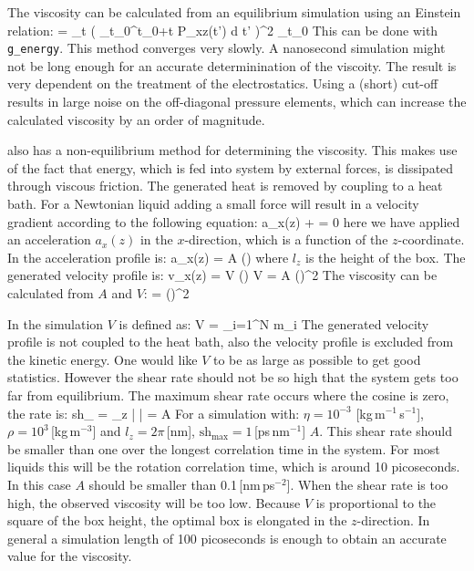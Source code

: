 The viscosity can be calculated from an equilibrium simulation using
an Einstein relation:
\beq
\eta =  \lim_{t \rightarrow \infty}
 \left\langle 
\left( \int_{t_0}^{{t_0}+t} P_{xz}(t') \mbox{d} t' \right)^2
\right\rangle_{t_0}
\eeq
This can be done with {\tt g\_energy}.
This method converges very slowly. A nanosecond simulation might not
be long enough for an accurate determinination of the viscoity.
The result is very dependent on the treatment of the electrostatics.
Using a (short) cut-off results in large noise on the off-diagonal
pressure elements, which can increase the calculated viscosity by an order
of magnitude.

{\gromacs} also has a non-equilibrium method for determining the viscosity.
This makes use of the fact that energy, which is fed into system by
external forces, is dissipated through viscous friction. The generated heat
is removed by coupling to a heat bath. For a Newtonian liquid adding a 
small force will result in a velocity gradient according to the following
equation:
\beq
a_x(z) + \frac{\eta}{\rho}  = 0
\eeq
here we have applied an acceleration $a_x(z)$ in the $x$-direction, which
is a function of the $z$-coordinate.
In {\gromacs} the acceleration profile is:
\beq
a_x(z) = A \cos\left(\right)
\eeq
where $l_z$ is the height of the box. The generated velocity profile is:
\beq
v_x(z) = V \cos\left(\right)
\eeq
\beq
V = A \frac{\rho}{\eta}\left(\right)^2
\eeq
The viscosity can be calculated from $A$ and $V$:
\beq
\label{visc}
\eta = \rho \left(\right)^2
\eeq

In the simulation $V$ is defined as:
\beq
V = 
         {\displaystyle \sum_{i=1}^N m_i}
\eeq
The generated velocity profile is not coupled to the heat bath, also
the velocity profile is excluded from the kinetic energy.
One would like $V$ to be as large as possible to get good statistics.
However the shear rate should not be so high that the system gets too far
from equilibrium. The maximum shear rate occurs where the cosine is zero,
the rate is:
\beq
\mbox{sh}_{\max} =  \max_z \left|  \right|
= A \frac{\rho}{\eta} 
\eeq
For a simulation with: $\eta=10^{-3}$ [kg\,m$^{-1}$\,s$^{-1}$],
$\rho=10^3$\,[kg\,m$^{-3}$] and $l_z=2\pi$\,[nm],
$\mbox{sh}_{\max}=1$\,[ps\,nm$^{-1}$] $A$.
This shear rate should be smaller than one over the longest
correlation time in the system. For most liquids this will be the rotation
correlation time, which is around 10 picoseconds. In this case $A$ should
be smaller than 0.1\,[nm\,ps$^{-2}$].
When the shear rate is too high, the observed viscosity will be too low.
Because $V$ is proportional to the square of the box height,
the optimal box is elongated in the $z$-direction.
In general a simulation length of 100 picoseconds is enough to obtain an
accurate value for the viscosity.

